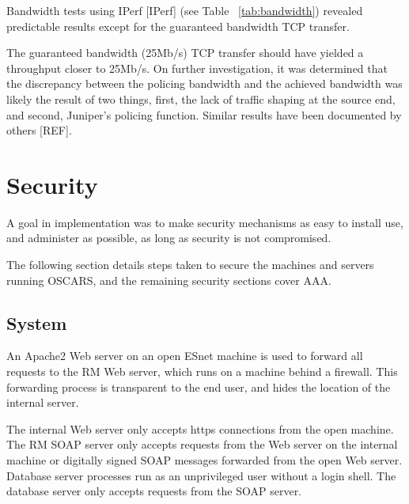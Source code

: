 \documentclass[conference]{IEEEtran}
\begin{document}
Bandwidth tests using IPerf [IPerf] (see Table ~\ref{tab:bandwidth}) revealed
predictable results except for the guaranteed bandwidth TCP transfer.

The guaranteed bandwidth (25Mb/s) TCP transfer should have yielded a 
throughput closer to 25Mb/s.  On further investigation, it was determined 
that the 
discrepancy between the policing bandwidth and the achieved bandwidth was 
likely the result of two things, first, the lack of traffic shaping at the 
source end, and second, Juniper's policing function.  Similar results have 
been documented by others [REF].


\section{Security}
A goal in implementation was to make security mechanisms as easy to install
use, and administer as possible, as long as security is not compromised.

The following section details steps taken to secure the machines and 
servers running OSCARS, and the remaining security sections cover AAA.

\subsection{System}

An Apache2 Web server on an open ESnet machine is used to forward all 
requests to the RM Web server, which runs on a machine behind a firewall. 
This forwarding process is transparent to the end user, and hides the location 
of the internal server.

The internal Web server only accepts https connections from the open machine.
The RM SOAP server only accepts requests from the Web server on the internal 
machine
or digitally signed SOAP messages forwarded from the open Web server.
Database server processes run as an unprivileged user without a login 
shell.  The database server only accepts requests from the SOAP server.
\end{document}

